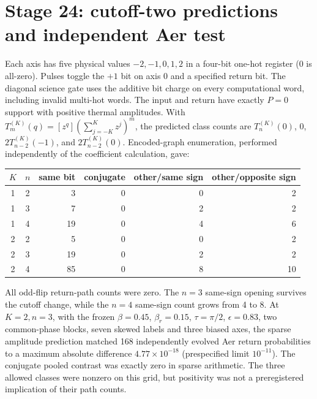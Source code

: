 \documentclass[10pt,a4paper]{article}
\begin{document}
\section*{Stage 24: cutoff-two predictions and independent Aer test}
Each axis has five physical values $-2,-1,0,1,2$ in a four-bit one-hot register (0 is all-zero). Pulses toggle the $+1$ bit on axis 0 and a specified return bit. The diagonal science gate uses the additive bit charge on every computational word, including invalid multi-hot words. The input and return have exactly $P=0$ support with positive thermal amplitudes. With $T_m^{(K)}(q)=[z^q](\sum_{j=-K}^{K}z^j)^m$, the predicted class counts are $T_n^{(K)}(0)$, $0$, $2T_{n-2}^{(K)}(-1)$, and $2T_{n-2}^{(K)}(0)$. Encoded-graph enumeration, performed independently of the coefficient calculation, gave:
\begin{center}
\small
\begin{tabular}{@{}c c r r r r@{}}\toprule
$K$ & $n$ & same bit & conjugate & other/same sign & other/opposite sign\\\midrule
1 & 2 & 3 & 0 & 0 & 2\\
1 & 3 & 7 & 0 & 2 & 2\\
1 & 4 & 19 & 0 & 4 & 6\\
2 & 2 & 5 & 0 & 0 & 2\\
2 & 3 & 19 & 0 & 2 & 2\\
2 & 4 & 85 & 0 & 8 & 10\\\bottomrule
\end{tabular}
\end{center}
All odd-flip return-path counts were zero. The $n=3$ same-sign opening survives the cutoff change, while the $n=4$ same-sign count grows from 4 to 8. At $K=2,n=3$, with the frozen $\beta=0.45$, $\beta_r=0.15$, $\tau=\pi/2$, $\epsilon=0.83$, two common-phase blocks, seven skewed labels and three biased axes, the sparse amplitude prediction matched 168 independently evolved Aer return probabilities to a maximum absolute difference $4.77\times10^{-18}$ (prespecified limit $10^{-11}$). The conjugate pooled contrast was exactly zero in sparse arithmetic. The three allowed classes were nonzero on this grid, but positivity was not a preregistered implication of their path counts.
\end{document}
